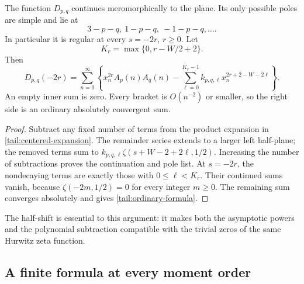 \begin{proposition}
\label{tail:ordinary}
The function \(D_{p,q}\) continues meromorphically to the plane. Its
only possible poles are simple and lie at
\[
 3-p-q,\ 1-p-q,\ -1-p-q,\ldots.
\]
In particular it is regular at every \(s=-2r\), \(r\ge0\).
Let
\[
 K_r=\max\{0,r-W/2+2\}.
\]
Then
\begin{equation}\label{tail:ordinary-formula}
 D_{p,q}(-2r)=\sum_{n=0}^{\infty}
 \left\{x_n^{2r}A_p(n)A_q(n)
       -\sum_{\ell=0}^{K_r-1}
         k_{p,q,\ell}x_n^{2r+2-W-2\ell}\right\}.
\end{equation}
An empty inner sum is zero. Every bracket is \(O(n^{-2})\) or
smaller, so the right side is an ordinary absolutely convergent sum.
\end{proposition}

\begin{proof}
Subtract any fixed number of terms from the product expansion in
\eqref{tail:centered-expansion}. The remainder series extends to a
larger left half-plane; the removed terms sum to
\(k_{p,q,\ell}\zeta(s+W-2+2\ell,1/2)\). Increasing the number of
subtractions proves the continuation and pole list. At \(s=-2r\),
the nondecaying terms are exactly those with \(0\le\ell<K_r\).
Their continued sums vanish, because
\(\zeta(-2m,1/2)=0\) for every integer \(m\ge0\). The remaining
sum converges absolutely and gives \eqref{tail:ordinary-formula}.
\end{proof}

The half-shift is essential to this argument: it makes both the
asymptotic powers and the polynomial subtraction compatible with the
trivial zeros of the same Hurwitz zeta function.

\subsection{A finite formula at every moment order}


